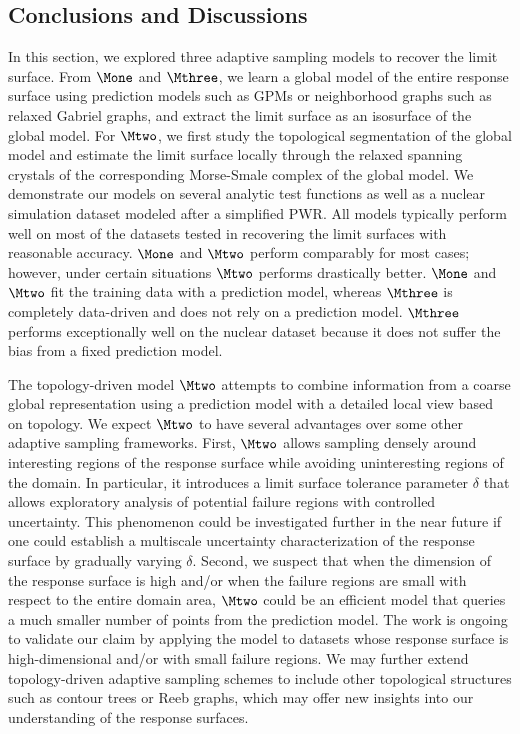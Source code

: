 \subsection{Conclusions and Discussions}
\label{sec:discussion}

In this section, we explored three adaptive sampling models to recover the limit surface.
%
From $\Mone$ and $\Mthree$,  we learn a global model of the entire response surface using prediction models such as GPMs or neighborhood graphs such as relaxed Gabriel graphs, and extract the limit surface as an isosurface of the global model.
%
For $\Mtwo$, we first study the topological segmentation of the global model and estimate the limit surface locally through the relaxed spanning crystals of the corresponding Morse-Smale complex of the global model.
%
We demonstrate our models on several analytic test functions as well as a nuclear simulation dataset modeled after a simplified PWR.
%
All models typically perform well on most of the datasets tested in recovering the limit surfaces with reasonable accuracy.
%
$\Mone$ and $\Mtwo$ perform comparably for most cases; however, under certain situations $\Mtwo$ performs drastically better.
%
$\Mone$ and $\Mtwo$ fit the training data with a prediction model, whereas $\Mthree$ is completely data-driven and does not rely on a prediction model.
%
$\Mthree$ performs exceptionally well on the nuclear dataset because it does not suffer the bias from a fixed prediction model.

The topology-driven model $\Mtwo$ attempts to combine information from a coarse global representation using a prediction model with a detailed local view based on topology.
%
We expect $\Mtwo$ to have several advantages over some other adaptive sampling frameworks.
%
First, $\Mtwo$ allows sampling densely around interesting regions of the response surface while avoiding uninteresting regions of the domain.
%
In particular, it introduces a limit surface tolerance parameter $\delta$ that allows exploratory analysis of potential failure regions with controlled uncertainty.
%
This phenomenon could be investigated further in the near future if one could establish a multiscale uncertainty characterization of the response surface by gradually varying $\delta$.
%
Second, we suspect that when the dimension of the response surface is high and/or when the failure regions are small with respect to the entire domain area, $\Mtwo$ could be an efficient model that queries a much smaller number of points from the prediction model.
%
The work is ongoing to validate our claim by applying the model to datasets whose response surface is high-dimensional and/or with small failure regions.
%
We may further extend topology-driven adaptive sampling schemes to include other topological structures such as contour trees or Reeb graphs, which may offer new insights into our understanding of the response surfaces.

